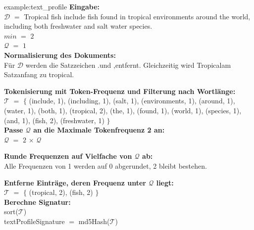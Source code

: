 \begin{example}{example:text_profile}
	\textbf{Eingabe:}\\
		$\mathcal{D}$ $=$ \glqq Tropical fish include fish found in tropical environments around the world,
			including both freshwater and salt water species.\grqq\\
		$min$ $=$ $2$\\
		$\mathcal{Q}$ $=$ $1$\\

	\textbf{Normalisierung des Dokuments:}\\
		Für $\mathcal{D}$ werden die Satzzeichen \glqq .\grqq und \glqq ,\grqq entfernt.
		Gleichzeitig wird \glqq Tropical\grqq am Satzanfang zu \glqq tropical\grqq .

	\textbf{Tokenisierung mit Token-Frequenz und Filterung nach Wortlänge:}\\
		$\mathcal{T}$ $=$ $\{$ (include, 1), (including, 1), (salt, 1), (environments, 1), (around, 1), (water, 1),
			(both, 1), (tropical, 2), (the, 1), (found, 1), (world, 1), (species, 1), (and, 1), (fish, 2), (freshwater, 1) $\}$\\

	\textbf{Passe $\mathcal{Q}$ an die Maximale Tokenfrequenz 2 an:}\\
		$\mathcal{Q}$ $=$ $2$ $\times$ $\mathcal{Q}$

	\textbf{Runde Frequenzen auf Vielfache von $\mathcal{Q}$ ab:}\\
		Alle Frequenzen von 1 werden auf 0 abgerundet, 2 bleibt bestehen.

	\textbf{Entferne Einträge, deren Frequenz unter $\mathcal{Q}$ liegt:}\\
		$\mathcal{T}$ $=$ $\{$ (tropical, 2), (fish, 2) $\}$\\
	
	\textbf{Berechne Signatur:}\\
		sort($\mathcal{T}$)\\
		textProfileSignature $=$ md5Hash($\mathcal{T}$)
\end{example}
